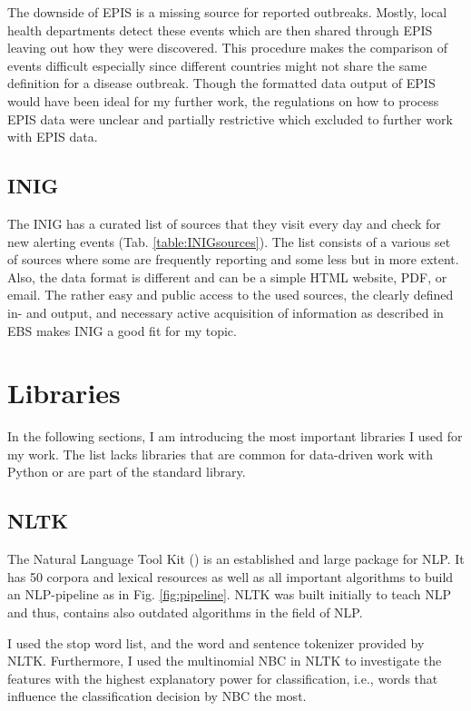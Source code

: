   The downside of EPIS is a missing source for reported outbreaks.
  Mostly, local health departments detect these events which are then shared through EPIS leaving out how they were discovered.
  This procedure makes the comparison of events difficult especially since different countries might not share the same definition for a disease outbreak.
  Though the formatted data output of EPIS would have been ideal for my further work, the regulations on how to process EPIS data were unclear and partially restrictive which excluded to further work with EPIS data.

\subsection{INIG}\label{INIGsources}
  The INIG has a curated list of sources that they visit every day and check for new alerting events (Tab. \ref{table:INIGsources}).
  The list consists of a various set of sources where some are frequently reporting and some less but in more extent.
  Also, the data format is different and can be a simple HTML website, PDF, or email.
  The rather easy and public access to the used sources, the clearly defined in- and output, and necessary active acquisition of information as described in EBS makes INIG a good fit for my topic.

\section{Libraries}
  In the following sections, I am introducing the most important libraries I used for my work.
  The list lacks libraries that are common for data-driven work with Python or are part of the standard library.

\subsection{NLTK}
  The Natural Language Tool Kit () is an established and large package for NLP.
  It has 50 corpora and lexical resources as well as all important algorithms to build an NLP-pipeline as in Fig. \ref{fig:pipeline}.
  NLTK was built initially to teach NLP and thus, contains also outdated algorithms in the field of NLP.

  I used the stop word list, and the word and sentence tokenizer provided by NLTK.
  Furthermore, I used the multinomial NBC in NLTK to investigate the features with the highest explanatory power for classification, i.e., words that influence the classification decision by NBC the most.

